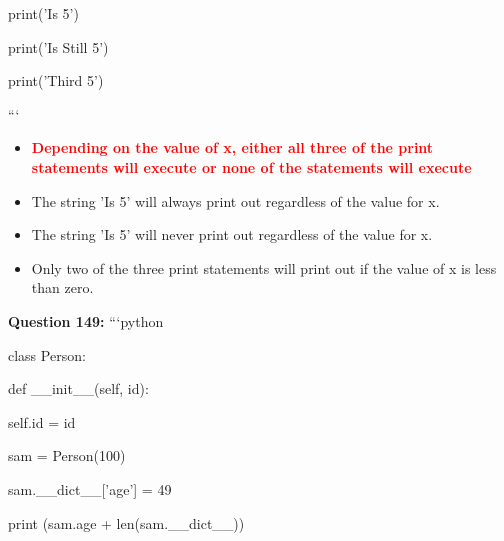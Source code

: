 \documentclass[12pt,a4paper]{article}
\begin{document}
\newline
    print('Is 5')\newline

\newline
    print('Is Still 5')\newline

\newline
    print('Third 5')\newline

\newline
```

\begin{itemize}
    \item[\textbf{A.}] \textcolor{red}{\textbf{Depending on the value of x, either all three of the print statements will execute or none of the statements will execute}}
    \item[\textbf{B.}] The string 'Is 5' will always print out regardless of the value for x.
    \item[\textbf{C.}] The string 'Is 5' will never print out regardless of the value for x.
    \item[\textbf{D.}] Only two of the three print statements will print out if the value of x is less than zero.
\end{itemize}

\vspace{0.5cm}

\textbf{Question 149:} ```python\newline

\newline
class Person:\newline

\newline
    def __init__(self, id):\newline

\newline
        self.id = id\newline

\newline
\newline

\newline
sam = Person(100)\newline

\newline
sam.__dict__['age'] = 49\newline

\newline
print (sam.age + len(sam.__dict__))\newline
\end{document}
